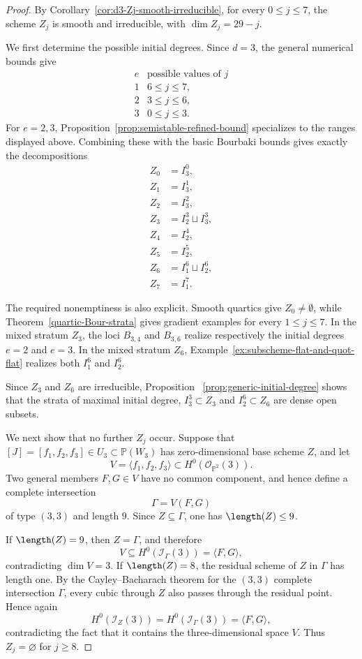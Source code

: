 \documentclass[11pt]{amsart} %
\theoremstyle{definition}
\def\NZQ{\mathbb}               %
\def\PP{{\NZQ P}}
\begin{document}
\begin{proof}
By Corollary~\ref{cor:d3-Zj-smooth-irreducible}, for every \(0\leq j\leq7\), the scheme $Z_j$ is smooth and irreducible, with \(
\dim Z_j=29-j\).

We first determine the possible initial degrees. Since $d=3$, the
general numerical bounds give
\[
\begin{array}{c|c}
e & \text{possible values of }j\\
\hline
1 & 6\leq j\leq7,\\
2 & 3\leq j\leq6,\\
3 & 0\leq j\leq3.
\end{array}
\]
For $e=2,3$, Proposition~\ref{prop:semistable-refined-bound}
specializes to the ranges displayed above. Combining these with the
basic Bourbaki bounds gives exactly the decompositions
\[
\begin{aligned}
Z_0&=I_3^0,\\
Z_1&=I_3^1,\\
Z_2&=I_3^2,\\
Z_3&=I_2^3\sqcup I_3^3,\\
Z_4&=I_2^4,\\
Z_5&=I_2^5,\\
Z_6&=I_1^6\sqcup I_2^6,\\
Z_7&=I_1^7.
\end{aligned}
\]

The required nonemptiness is also explicit. Smooth quartics give
$Z_0\neq\emptyset$, while Theorem~\ref{quartic-Bour-strata} gives
gradient examples for every $1\leq j\leq7$. In the mixed stratum
$Z_3$, the loci $B_{3,4}$ and $B_{3,6}$ realize respectively the
initial degrees $e=2$ and $e=3$. In the mixed stratum $Z_6$,
Example~\ref{ex:subscheme-flat-and-quot-flat} realizes both
$I_1^6$ and $I_2^6$.

Since $Z_3$ and $Z_6$ are irreducible, Proposition~
\ref{prop:generic-initial-degree} shows that the strata of maximal
initial degree, \(I_3^3\subset Z_3\) and \(I_2^6\subset Z_6\) are dense open subsets.

We next show that no further $Z_j$ occur. Suppose that $[J]=[f_1,f_2,f_3] \in U_3 \subset \mathbb{P}(W_3)$ has zero-dimensional base scheme $Z$, and let
\[
V=\langle f_1,f_2,f_3\rangle\subset H^0(\mathcal O_{\PP^2}(3)).
\]
Two general members $F,G\in V$ have no common component, and hence
define a complete intersection
\[
\Gamma=V(F,G)
\]
of type $(3,3)$ and length $9$. Since $Z\subseteq\Gamma$, one has
$\length(Z)\leq9$.

If $\length(Z)=9$, then $Z=\Gamma$, and therefore
\[
V\subseteq H^0(\mathcal I_\Gamma(3))
=
\langle F,G\rangle,
\]
contradicting $\dim V=3$. If $\length(Z)=8$, the residual scheme of
$Z$ in $\Gamma$ has length one. By the Cayley--Bacharach theorem for
the $(3,3)$ complete intersection $\Gamma$, every cubic through $Z$
also passes through the residual point. Hence again
\[
H^0(\mathcal I_Z(3))
=
H^0(\mathcal I_\Gamma(3))
=
\langle F,G\rangle,
\]
contradicting the fact that it contains the three-dimensional space
$V$. Thus \(Z_j=\varnothing\) for \(j\geq8\).


\end{proof}
\end{document}
